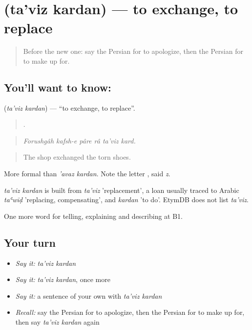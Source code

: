 \section[\texorpdfstring{\fa{تعویض} \fa{کردن} (ta'viz kardan)}{تعویض کردن (ta'viz kardan)}]{  (ta'viz kardan) — to exchange, to replace}

\label{lesson:FA-C442-taviz-kardan}



\begin{quote}
Before the new one: say the Persian for to apologize, then the Persian for to make up for.
\end{quote}

\subsection*{You'll want to know:  }
\textbf{ } (\emph{ta'viz kardan}) — \textquotedblleft{}to exchange, to replace\textquotedblright{}.

\begin{quote}
     .
\end{quote}

\begin{quote}
\emph{Forushgâh kafsh-e pâre râ ta'viz kard.}
\end{quote}

\begin{quote}
The shop exchanged the torn shoes.
\end{quote}

More formal than \emph{'avaz kardan}. Note the letter , said \emph{z}.

\begin{cousinweb}
\emph{ta'viz kardan} is built from \emph{ta'viz} 'replacement', a loan usually traced to Arabic \emph{taʿwīḍ} 'replacing, compensating', and \emph{kardan} 'to do'. EtymDB does not list \emph{ta'viz}.
\end{cousinweb}

\begin{grammarlens}[title={What you've built}]
One more word for telling, explaining and describing at B1.
\end{grammarlens}

\subsection*{Your turn}
\begin{itemize}
\raggedright
  \item \emph{Say it:} \emph{ta'viz kardan}
  \item \emph{Say it:} \emph{ta'viz kardan}, once more
  \item \emph{Say it:} a sentence of your own with \emph{ta'viz kardan}
  \item \emph{Recall:} say the Persian for to apologize, then the Persian for to make up for, then say \emph{ta'viz kardan} again
\end{itemize}

